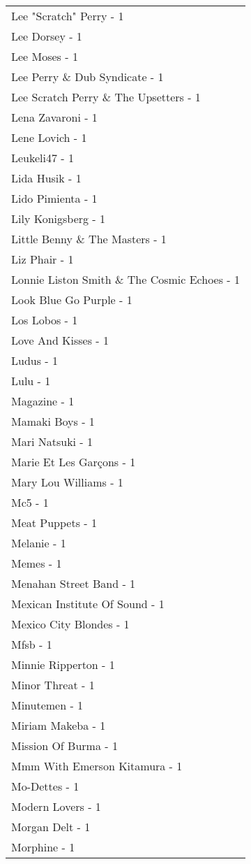 \documentclass[
]{article}
\begin{document}
\begin{longtable}{l}
Lee "Scratch" Perry - 1 \\ 
Lee Dorsey - 1 \\ 
Lee Moses - 1 \\ 
Lee Perry \& Dub Syndicate - 1 \\ 
Lee Scratch Perry \& The Upsetters - 1 \\ 
Lena Zavaroni - 1 \\ 
Lene Lovich - 1 \\ 
Leukeli47 - 1 \\ 
Lida Husik - 1 \\ 
Lido Pimienta - 1 \\ 
Lily Konigsberg - 1 \\ 
Little Benny \& The Masters - 1 \\ 
Liz Phair - 1 \\ 
Lonnie Liston Smith \& The Cosmic Echoes - 1 \\ 
Look Blue Go Purple - 1 \\ 
Los Lobos - 1 \\ 
Love And Kisses - 1 \\ 
Ludus - 1 \\ 
Lulu - 1 \\ 
Magazine - 1 \\ 
Mamaki Boys - 1 \\ 
Mari Natsuki - 1 \\ 
Marie Et Les Garçons - 1 \\ 
Mary Lou Williams - 1 \\ 
Mc5 - 1 \\ 
Meat Puppets - 1 \\ 
Melanie - 1 \\ 
Memes - 1 \\ 
Menahan Street Band - 1 \\ 
Mexican Institute Of Sound - 1 \\ 
Mexico City Blondes - 1 \\ 
Mfsb - 1 \\ 
Minnie Ripperton - 1 \\ 
Minor Threat - 1 \\ 
Minutemen - 1 \\ 
Miriam Makeba - 1 \\ 
Mission Of Burma - 1 \\ 
Mmm With Emerson Kitamura - 1 \\ 
Mo-Dettes - 1 \\ 
Modern Lovers - 1 \\ 
Morgan Delt - 1 \\ 
Morphine - 1 \\ 

\end{longtable}
\end{document}
